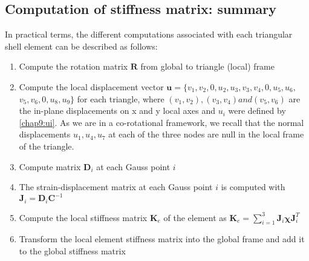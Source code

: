 \subsection{Computation of stiffness matrix: summary}	\label{chap9:summary}
In practical terms, the different computations associated with each triangular shell element can be described as follows:
%
\begin{enumerate}
\item Compute the rotation matrix $\textbf{R}$ from global to triangle (local) frame
\item Compute the local displacement vector $\textbf{u} = \{v_1, v_2, 0, u_2, u_3, v_3, v_4, 0, u_5, u_6,$ $v_5, v_6, 0, u_8, u_9 \} $ for each triangle, where $ (v_1, v_2), (v_3, v_4) and (v_5, v_6) $ are the in-plane displacements on x and y local axes and $ u_i $ were defined by \eqref{chap9:ui}. As we are in a co-rotational framework, we recall that the normal displacements $u_1, u_4, u_7$ at each of the three nodes are null in the local frame of the triangle. 
\item Compute matrix $\textbf{D}_i$  at each Gauss point $i$
\item The strain-displacement matrix at each Gauss point $i$ is computed with $\textbf{J}_i = \textbf{D}_i \textbf{C}^{-1}$
\item Compute the local stiffness matrix $\textbf{K}_e$ of the element as $\textbf{K}_e = \displaystyle{\sum^3_{i=1}} \textbf{J}_i \boldsymbol\chi \textbf{J}_i^T$
\item Transform the local element stiffness matrix into the global frame and add it to the global stiffness matrix
\end{enumerate}


